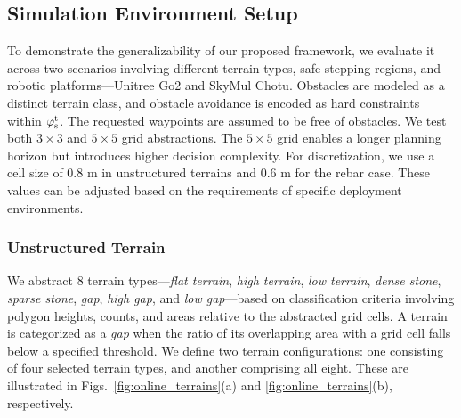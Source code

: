\subsection{Simulation Environment Setup}
To demonstrate the generalizability of our proposed framework, we evaluate it across two scenarios involving different terrain types, safe stepping regions, and robotic platforms—Unitree Go2 and SkyMul Chotu. Obstacles are modeled as a distinct terrain class, and obstacle avoidance is encoded as hard constraints within $\varphi_\textrm{s}^\textrm{t}$. The requested waypoints are assumed to be free of obstacles.
We test both $3 \times 3$ and $5 \times 5$ grid abstractions. The $5 \times 5$ grid enables a longer planning horizon but introduces higher decision complexity. For discretization, we use a cell size of 0.8 m in unstructured terrains and 0.6 m for the rebar case. These values can be adjusted based on the requirements of specific deployment environments.


\subsubsection{Unstructured Terrain}
We abstract 8 terrain types—\textit{flat terrain}, \textit{high terrain}, \textit{low terrain}, \textit{dense stone}, \textit{sparse stone}, \textit{gap}, \textit{high gap}, and \textit{low gap}—based on classification criteria involving polygon heights, counts, and areas relative to the abstracted grid cells. A terrain is categorized as a \textit{gap} when the ratio of its overlapping area with a grid cell falls below a specified threshold.
We define two terrain configurations: one consisting of four selected terrain types, and another comprising all eight. These are illustrated in Figs.~\ref{fig:online_terrains}(a) and \ref{fig:online_terrains}(b), respectively.

